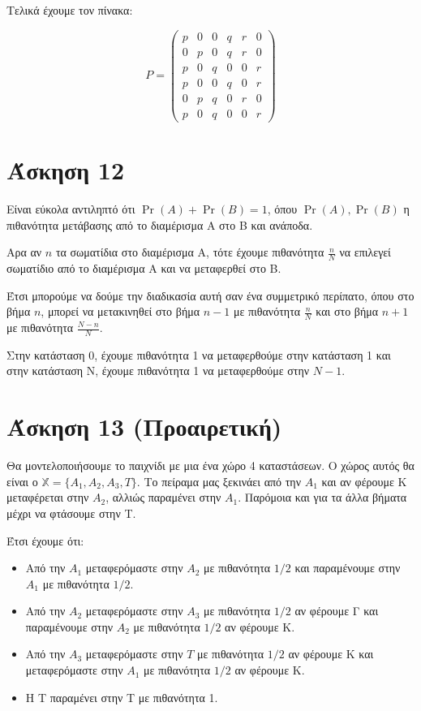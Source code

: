 \documentclass{article}
\begin{document}
Τελικά έχουμε τον πίνακα:

\begin{equation*}
    P = 
    \begin{pmatrix}
        p & 0 & 0 & q & r & 0\\
        0 & p & 0 & q & r & 0\\
        p & 0 & q & 0 & 0 & r\\
        p & 0 & 0 & q & 0 & r\\
        0 & p & q & 0 & r & 0\\
        p & 0 & q & 0 & 0 & r
    \end{pmatrix}
\end{equation*}

\section*{Άσκηση 12}
Είναι εύκολα αντιληπτό ότι $\Pr(A) + \Pr(B) = 1$, όπου $\Pr(A), \Pr(B)$ η πιθανότητα μετάβασης από το διαμέρισμα Α στο Β και ανάποδα.

Αρα αν $n$ τα σωματίδια στο διαμέρισμα Α, τότε έχουμε πιθανότητα $\frac{n}{N}$ να επιλεγεί σωματίδιο από το διαμέρισμα Α και να μεταφερθεί στο Β. 

Έτσι μπορούμε να δούμε την διαδικασία αυτή σαν ένα συμμετρικό περίπατο, όπου στο βήμα $n$, μπορεί να μετακινηθεί στο βήμα $n-1$ με πιθανότητα $\frac{n}{N}$ και στο βήμα $n+1$ με πιθανότητα $\frac{N-n}{N}$. 

Στην κατάσταση 0, έχουμε πιθανότητα 1 να μεταφερθούμε στην κατάσταση 1 και στην κατάσταση Ν, έχουμε πιθανότητα 1 να μεταφερθούμε στην $N-1$.

\section*{Άσκηση 13 (Προαιρετική)}

Θα μοντελοποιήσουμε το παιχνίδι με μια ένα χώρο 4 καταστάσεων. Ο χώρος αυτός θα είναι ο $\mathbb{X} = \{A_1, A_2, A_3, T\}$. Το πείραμα μας ξεκινάει από την $A_1$ και αν φέρουμε Κ μεταφέρεται στην $A_2$, αλλιώς παραμένει στην $A_1$. Παρόμοια και για τα άλλα βήματα μέχρι να φτάσουμε στην Τ.

Έτσι έχουμε ότι:
\begin{itemize}
    \item Από την $A_1$ μεταφερόμαστε στην $A_2$ με πιθανότητα $1/2$ και παραμένουμε στην $A_1$ με πιθανότητα $1/2$.
    \item Από την $A_2$ μεταφερόμαστε στην $A_3$ με πιθανότητα $1/2$ αν φέρουμε Γ και παραμένουμε στην $A_2$ με πιθανότητα $1/2$ αν φέρουμε Κ.
    \item  Από την $A_3$ μεταφερόμαστε στην $T$ με πιθανότητα $1/2$ αν φέρουμε Κ και μεταφερόμαστε στην $A_1$ με πιθανότητα $1/2$ αν φέρουμε Κ.
    \item Η Τ παραμένει στην Τ με πιθανότητα 1.
\end{itemize}
\end{document}
